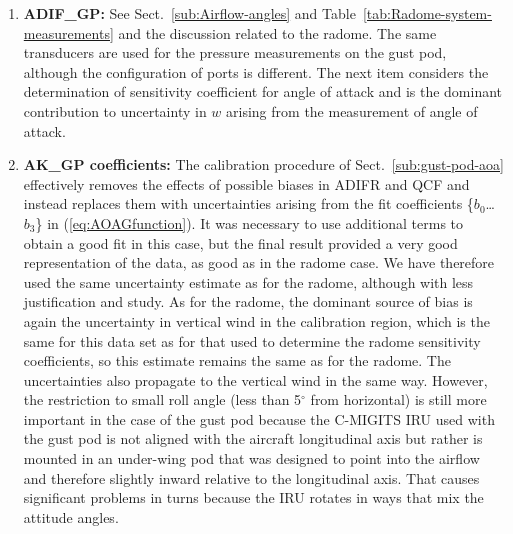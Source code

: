 \documentclass[12pt,twoside,english]{article}\usepackage[]{graphicx}\usepackage[]{color}
\begin{document}
\begin{enumerate}
\item \textbf{ADIF\_GP: }See Sect.~\ref{sub:Airflow-angles} and Table~\ref{tab:Radome-system-measurements} and the discussion related to the radome. The same transducers are used for the pressure measurements on the gust pod, although the configuration of ports is different. The next item considers the determination of sensitivity coefficient for angle of attack and is the dominant contribution to uncertainty in $w$ arising from the measurement of angle of attack.  
\item \textbf{AK\_GP coefficients:} The calibration procedure of Sect.~\ref{sub:gust-pod-aoa}
effectively removes the effects of possible biases in ADIFR and QCF and instead replaces them with uncertainties arising from the fit coefficients \{$b_0$\dots$b_3$\} in (\ref{eq:AOAGfunction}). It was necessary to use additional terms to obtain a good fit in this case, but the final result provided a very good representation of the data, as good as in the radome case. We have therefore used the same uncertainty estimate as for the radome, although with less justification and study. As for the radome, the dominant source of bias is again the uncertainty in vertical wind in the calibration region, which is the same for this data set as for that used to determine the radome sensitivity coefficients, so this estimate remains the same as for the radome. The uncertainties also propagate to the vertical wind in the same way. However, the restriction to small roll angle (less than 5$^{\circ}$ from horizontal) is still more important in the case of the gust pod because the C-MIGITS IRU used with the gust pod is not aligned with the aircraft longitudinal axis but rather is mounted in an under-wing pod that was designed to point into the airflow and therefore slightly inward relative to the longitudinal axis. That causes significant problems in turns because the IRU rotates in ways that mix the attitude angles. 


\end{enumerate}
\end{document}
